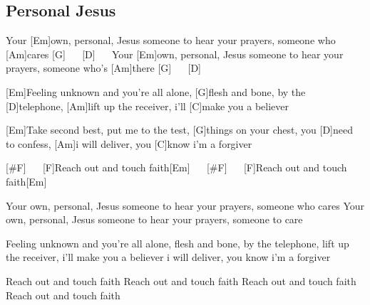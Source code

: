 \subsection*{Personal Jesus   }



\begin{guitar}

Your [Em]own, personal, Jesus
someone to hear your prayers,
someone who [Am]cares [G] $\quad$ [D] $\quad$
Your [Em]own, personal, Jesus
someone to hear your prayers,
someone who's [Am]there  [G] $\quad$ [D] $\quad$


[Em]Feeling unknown
and you're all alone,
[G]flesh and bone,
by the [D]telephone,
[Am]lift up the receiver,
i'll [C]make you a believer

[Em]Take second best,
put me to the test,
[G]things on your chest,
you [D]need to confess,
[Am]i will deliver,
you [C]know i'm a forgiver


[#F] $\quad$ [F]Reach out and touch faith[Em] $\quad$
[#F] $\quad$ [F]Reach out and touch faith[Em] $\quad$


Your own, personal, Jesus
someone to hear your prayers,
someone who cares
Your own, personal, Jesus
someone to hear your prayers,
someone to care

Feeling unknown
and you're all alone,
flesh and bone,
by the telephone,
lift up the receiver,
i'll make you a believer
i will deliver,
you know i'm a forgiver

Reach out and touch faith
Reach out and touch faith
Reach out and touch faith
Reach out and touch faith
\end{guitar}
